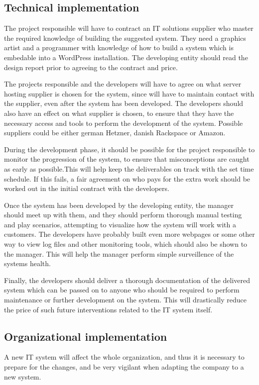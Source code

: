 \subsection{Technical implementation}
The project responsible will have to contract an IT solutions supplier who 
master the required knowledge of building the suggested system. They need
a graphics artist and a programmer with knowledge of how to build a system
which is embedable into a WordPress installation. The developing entity
should read the design report prior to agreeing to the contract and
price. 

The projects responsible and the developers will have to agree on what server
hosting supplier is chosen for the system, since \gomonkey{} will have to maintain
contact with the supplier, even after the system has been developed. The 
developers should also have an effect on what supplier is chosen, to ensure that
they have the necessary access and tools to perform the development of the
system. Possible suppliers could be either german Hetzner, danish
Rackspace or Amazon.

During the development phase, it should be possible for the project responsible
to monitor the progression of the system, to ensure that misconceptions are 
caught as early as possible.This will help keep the deliverables on track with
the set time schedule. If this fails, a fair agreement on who pays for the 
extra work should be worked out in the initial contract with the developers.

Once the system has been developed by the developing entity, the manager should meet up with 
them, and they should perform thorough manual testing and play scenarios, 
attempting to visualize how the system will work with a customers. The
developers have probably built even more webpages or some other way to view 
log files and other monitoring tools, which should also be shown to the manager. 
This will help the manager perform simple surveillence of the systems health.

Finally, the developers should deliver a thorough documentation of the 
delivered system which can be passed on to anyone who should be required to 
perform maintenance or further development on the system. This will drastically
reduce the price of such future interventions related to the IT system itself.

\subsection{Organizational implementation}
A new IT system will affect the whole 
organization, and thus it is necessary to prepare for the changes, and be very
vigilant when adapting the company to a new system. 

